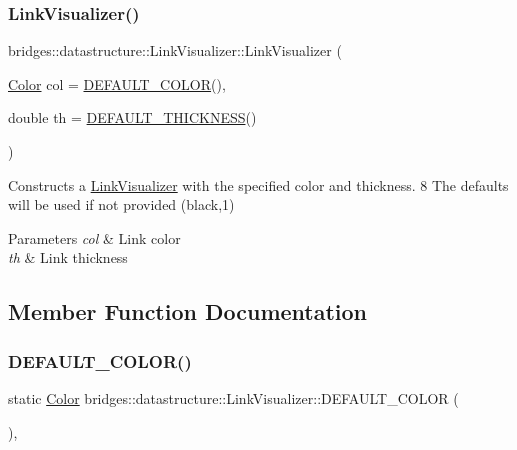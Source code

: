 \subsubsection{\texorpdfstring{Link\+Visualizer()}{LinkVisualizer()}}
{\footnotesize\ttfamily bridges\+::datastructure\+::\+Link\+Visualizer\+::\+Link\+Visualizer (\begin{DoxyParamCaption}\item[{\hyperlink{classbridges_1_1datastructure_1_1_color}{Color}}]{col = {\ttfamily \hyperlink{classbridges_1_1datastructure_1_1_link_visualizer_aa42e1a41ab0332c2e50e1a21068b2533}{D\+E\+F\+A\+U\+L\+T\+\_\+\+C\+O\+L\+OR}()},  }\item[{double}]{th = {\ttfamily \hyperlink{classbridges_1_1datastructure_1_1_link_visualizer_a3b23cb9f5ab2dd564fcc4d974e3753f8}{D\+E\+F\+A\+U\+L\+T\+\_\+\+T\+H\+I\+C\+K\+N\+E\+SS}()} }\end{DoxyParamCaption})\hspace{0.3cm}{\ttfamily [inline]}}



Constructs a \hyperlink{classbridges_1_1datastructure_1_1_link_visualizer}{Link\+Visualizer} with the specified color and thickness. 8 The defaults will be used if not provided (black,1) 


\begin{DoxyParams}{Parameters}
{\em col} & Link color \\
\hline
{\em th} & Link thickness \\
\hline
\end{DoxyParams}


\subsection{Member Function Documentation}
\mbox{\label{classbridges_1_1datastructure_1_1_link_visualizer_aa42e1a41ab0332c2e50e1a21068b2533}} 
\subsubsection{\texorpdfstring{D\+E\+F\+A\+U\+L\+T\+\_\+\+C\+O\+L\+O\+R()}{DEFAULT\_COLOR()}}
{\footnotesize\ttfamily static \hyperlink{classbridges_1_1datastructure_1_1_color}{Color} bridges\+::datastructure\+::\+Link\+Visualizer\+::\+D\+E\+F\+A\+U\+L\+T\+\_\+\+C\+O\+L\+OR (\begin{DoxyParamCaption}{ }\end{DoxyParamCaption})\hspace{0.3cm}{\ttfamily [inline]}, {\ttfamily [static]}}



